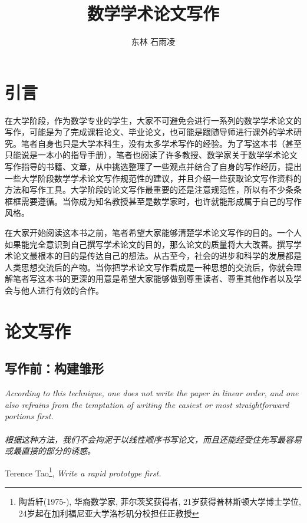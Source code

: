 \documentclass{formatBook}
\begin{document}
\title{数学学术论文写作}
\author{东林 \quad 石雨凌}
\maketitle
\tableofcontents
\newpage
\chapter{引言}
在大学阶段，作为数学专业的学生，大家不可避免会进行一系列的数学学术论文的写作，可能是为了完成课程论文、毕业论文，也可能是跟随导师进行课外的学术研究。笔者自身也只是大学本科生，没有太多学术写作的经验。为了写这本书（甚至只能说是一本小的指导手册），笔者也阅读了许多教授、数学家关于数学学术论文写作指导的书籍、文章，从中挑选整理了一些观点并结合了自身的写作经历，提出一些大学阶段数学学术论文写作规范性的建议，并且介绍一些获取论文写作资料的方法和写作工具。大学阶段的论文写作最重要的还是注意规范性，所以有不少条条框框需要遵循。当你成为知名教授甚至是数学家时，也许就能形成属于自己的写作风格。

\par 在大家开始阅读这本书之前，笔者希望大家能够清楚学术论文写作的目的。一个人如果能完全意识到自己撰写学术论文的目的，那么论文的质量将大大改善。撰写学术论文最根本的目的是传达自己的想法。从古至今，社会的进步和科学的发展都是人类思想交流后的产物。当你把学术论文写作看成是一种思想的交流后，你就会理解笔者写这本书的更深的用意是希望大家能够做到尊重读者、尊重其他作者以及学会与他人进行有效的合作。

\chapter{论文写作}
\section{写作前：构建雏形}
\noindent \textit{According to this technique, one does not write the paper in linear order, and one also refrains from
the temptation of writing the easiest or most straightforward portions first. \\ \ \\ 根据这种方法，我们不会拘泥于以线性顺序书写论文，而且还能经受住先写最容易或最直接的部分的诱惑。} 
\begin{flushright}
\cndash Terence Tao\footnote{陶哲轩(1975-), 华裔数学家, 菲尔茨奖获得者, 21岁获得普林斯顿大学博士学位,  24岁起在加利福尼亚大学洛杉矶分校担任正教授}, \textit{Write a rapid prototype first.}
\end{flushright}
\end{document}
